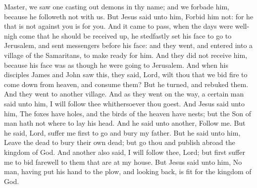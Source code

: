 Master, we saw one casting out demons in thy name; and we forbade him, because he followeth not with us. But Jesus said unto him, Forbid him not: for he that is not against you is for you.  And it came to pass, when the days were well-nigh come that he should be received up, he stedfastly set his face to go to Jerusalem, and sent messengers before his face: and they went, and entered into a village of the Samaritans, to make ready for him. And they did not receive him, because his face was as though he were going to Jerusalem. And when his disciples James and John saw this, they said, Lord, wilt thou that we bid fire to come down from heaven, and consume them? But he turned, and rebuked them. And they went to another village.  And as they went on the way, a certain man said unto him, I will follow thee whithersoever thou goest. And Jesus said unto him, The foxes have holes, and the birds of the heaven have nests; but the Son of man hath not where to lay his head. And he said unto another, Follow me. But he said, Lord, suffer me first to go and bury my father. But he said unto him, Leave the dead to bury their own dead; but go thou and publish abroad the kingdom of God. And another also said, I will follow thee, Lord; but first suffer me to bid farewell to them that are at my house. But Jesus said unto him, No man, having put his hand to the plow, and looking back, is fit for the kingdom of God. 

